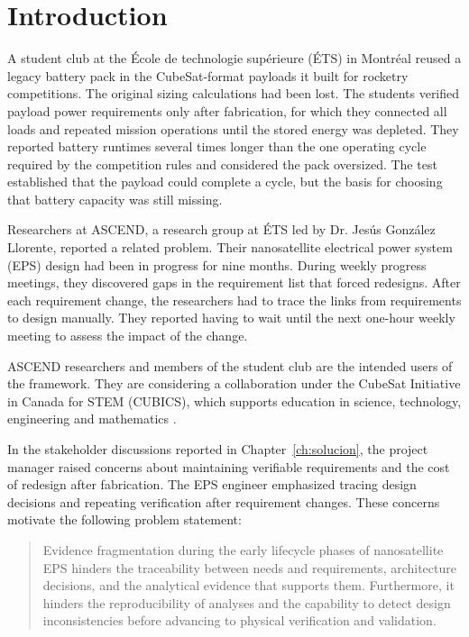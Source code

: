 
\chapter{Introduction}
\label{chp:intro}

A student club at the École de technologie supérieure (ÉTS) in Montréal reused a legacy battery pack in the CubeSat-format payloads it built for rocketry competitions. The original sizing calculations had been lost.
The students verified payload power requirements only after fabrication, for which they connected all loads and repeated mission operations until the stored energy was depleted.
They reported battery runtimes several times longer than the one operating cycle required by the competition rules and considered the pack oversized. The test established that the payload could complete a cycle, but the basis for choosing that battery capacity was still missing.

Researchers at ASCEND, a research group at ÉTS led by Dr. Jesús González Llorente, reported a related problem. Their nanosatellite electrical power system (EPS) design had been in progress for nine months.
During weekly progress meetings, they discovered gaps in the requirement list that forced redesigns.
After each requirement change, the researchers had to trace the links from requirements to design manually. They reported having to wait until the next one-hour weekly meeting to assess the impact of the change.

ASCEND researchers and members of the student club are the intended users of the framework. They are considering a collaboration under the CubeSat Initiative in Canada for STEM (CUBICS), which supports education in science, technology, engineering and mathematics \citep{csa2026cubics}.

In the stakeholder discussions reported in Chapter~\ref{ch:solucion}, the project manager raised concerns about maintaining verifiable requirements and the cost of redesign after fabrication. The EPS engineer emphasized tracing design decisions and repeating verification after requirement changes.
These concerns motivate the following problem statement:

\begin{quote}
Evidence fragmentation during the early lifecycle phases of nanosatellite EPS hinders the traceability between needs and requirements, architecture decisions, and the analytical evidence that supports them. Furthermore, it hinders the reproducibility of analyses and the capability to detect design inconsistencies before advancing to physical verification and validation.
\end{quote}


